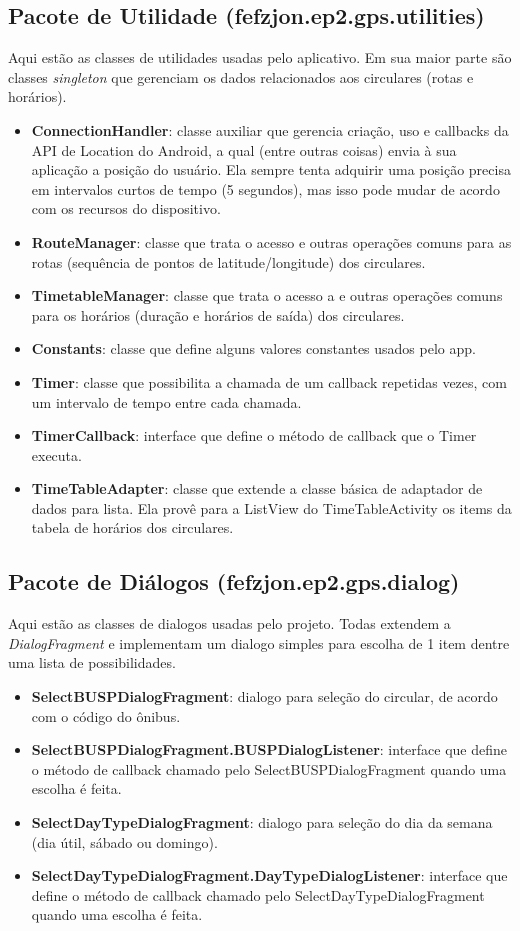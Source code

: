 \subsection{Pacote de Utilidade (fefzjon.ep2.gps.utilities)}
Aqui estão as classes de utilidades usadas pelo aplicativo. Em sua maior parte são classes \textit{singleton} que
gerenciam os dados relacionados aos circulares (rotas e horários).
\begin{itemize}
    \item \textbf{ConnectionHandler}: classe auxiliar que gerencia criação, uso e callbacks da API de Location do Android, a qual (entre outras coisas)
        envia à sua aplicação a posição do usuário. Ela sempre tenta adquirir uma posição precisa em intervalos curtos de tempo (5 segundos), mas
        isso pode mudar de acordo com os recursos do dispositivo.
    \item \textbf{RouteManager}: classe que trata o acesso e outras operações comuns para as rotas (sequência de pontos de latitude/longitude) dos circulares.
    \item \textbf{TimetableManager}: classe que trata o acesso a e outras operações comuns para os horários (duração e horários de saída) dos circulares.
    \item \textbf{Constants}: classe que define alguns valores constantes usados pelo app.
    \item \textbf{Timer}: classe que possibilita a chamada de um callback repetidas vezes, com um intervalo de tempo entre cada chamada.
    \item \textbf{TimerCallback}: interface que define o método de callback que o Timer executa.
    \item \textbf{TimeTableAdapter}: classe que extende a classe básica de adaptador de dados para lista. Ela provê para a ListView do TimeTableActivity
          os items da tabela de horários dos circulares.
\end{itemize}

\subsection{Pacote de Diálogos (fefzjon.ep2.gps.dialog)}
Aqui estão as classes de dialogos usadas pelo projeto. Todas extendem a \textit{DialogFragment} e implementam
um dialogo simples para escolha de 1 item dentre uma lista de possibilidades.
\begin{itemize}
    \item \textbf{SelectBUSPDialogFragment}: dialogo para seleção do circular, de acordo com o código do ônibus.
    \item \textbf{SelectBUSPDialogFragment.BUSPDialogListener}: interface que define o método de callback chamado 
          pelo SelectBUSPDialogFragment quando uma escolha é feita.
    \item \textbf{SelectDayTypeDialogFragment}: dialogo para seleção do dia da semana (dia útil, sábado ou domingo).
    \item \textbf{SelectDayTypeDialogFragment.DayTypeDialogListener}: interface que define o método de callback chamado
          pelo SelectDayTypeDialogFragment quando uma escolha é feita.
\end{itemize}

